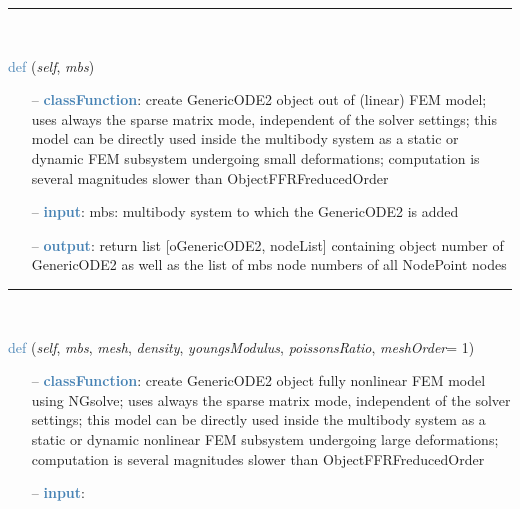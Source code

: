 \begin{itemize}[leftmargin=1.4cm]
\begin{itemize}[leftmargin=0.5cm]
\begin{itemize}[leftmargin=1.4cm]
\begin{itemize}[leftmargin=0.5cm]
%
\noindent\rule{8cm}{0.75pt}\vspace{1pt} \\ 
\begin{flushleft}
\noindent \textcolor{steelblue}{def {\bf {}}}\label{sec:FEM:FEMinterface:CreateLinearFEMObjectGenericODE2}
({\it self}, {\it mbs})
\end{flushleft}
\setlength{\itemindent}{0.7cm}
\begin{itemize}[leftmargin=0.7cm]
  \item[--]  \textcolor{steelblue}{\bf classFunction}: create GenericODE2 object out of (linear) FEM model; uses always the sparse matrix mode, independent of the solver settings; this model can be directly used inside the multibody system as a static or dynamic FEM subsystem undergoing small deformations; computation is several magnitudes slower than ObjectFFRFreducedOrder  \item[--]  \textcolor{steelblue}{\bf input}: mbs: multibody system to which the GenericODE2 is added  \item[--]  \textcolor{steelblue}{\bf output}: return list [oGenericODE2, nodeList] containing object number of GenericODE2 as well as the list of mbs node numbers of all NodePoint nodes\vspace{12pt}\end{itemize}
%
\noindent\rule{8cm}{0.75pt}\vspace{1pt} \\ 
\begin{flushleft}
\noindent \textcolor{steelblue}{def {\bf {}}}\label{sec:FEM:FEMinterface:CreateNonlinearFEMObjectGenericODE2NGsolve}
({\it self}, {\it mbs}, {\it mesh}, {\it density}, {\it youngsModulus}, {\it poissonsRatio}, {\it meshOrder}= 1)
\end{flushleft}
\setlength{\itemindent}{0.7cm}
\begin{itemize}[leftmargin=0.7cm]
  \item[--]  \textcolor{steelblue}{\bf classFunction}: create GenericODE2 object fully nonlinear FEM model using NGsolve; uses always the sparse matrix mode, independent of the solver settings; this model can be directly used inside the multibody system as a static or dynamic nonlinear FEM subsystem undergoing large deformations; computation is several magnitudes slower than ObjectFFRFreducedOrder  \item[--]  \textcolor{steelblue}{\bf input}: \vspace{-6pt}

\end{itemize}
\end{itemize}
\end{itemize}
\end{itemize}
\end{itemize}
